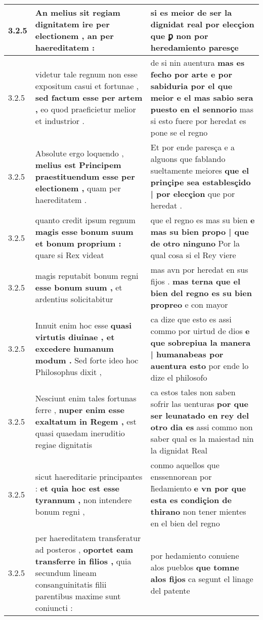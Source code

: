 \begin{tabular}{|p{1cm}|p{6.5cm}|p{6.5cm}|}
3.2.5 & An melius sit regiam dignitatem \textbf{ ire per electionem , } an per haereditatem : & si es meior de ser la dignidat real \textbf{ por elecçion } que ꝑ non por heredamiento paresçe \\\hline
3.2.5 & videtur tale regnum non esse expositum casui et fortunae , \textbf{ sed factum esse per artem , } eo quod praeficietur melior et industrior . & de si nin auentura \textbf{ mas es fecho por arte e por sabiduria por el que meior e el mas sabio sera puesto en el sennorio } mas si esto fuere por heredat es pone se el regno \\\hline
3.2.5 & Absolute ergo loquendo , \textbf{ melius est Principem praestituendum esse per electionem , } quam per haereditatem . & Et por ende paresça e a alguons que fablando sueltamente meiores \textbf{ que el prinçipe sea establesçido | por elecçion } que por heredat . \\\hline
3.2.5 & quanto credit ipsum regnum \textbf{ magis esse bonum suum et bonum proprium : } quare si Rex videat & que el regno es mas su bien \textbf{ e mas su bien propo | que de otro ninguno } Por la qual cosa si el Rey viere \\\hline
3.2.5 & magis reputabit bonum regni \textbf{ esse bonum suum , } et ardentius solicitabitur & mas avn por heredat en sus fijos . \textbf{ mas terna que el bien del regno es su bien propreo } e con mayor \\\hline
3.2.5 & Innuit enim hoc esse \textbf{ quasi virtutis diuinae , et excedere humanum modum . } Sed forte ideo hoc Philosophus dixit , & ca dize que esto es assi commo por uirtud de dios \textbf{ e que sobrepiua la manera | humanabeas por auentura esto } por ende lo dize el philosofo \\\hline
3.2.5 & Nesciunt enim tales fortunas ferre , \textbf{ nuper enim esse exaltatum in Regem , } est quasi quaedam ineruditio regiae dignitatis & ca estos tales non saben sofrir las uenturas \textbf{ por que ser leunatado en rey del otro dia es } assi commo non saber qual es la maiestad nin la dignidat Real \\\hline
3.2.5 & sicut haereditarie principantes : \textbf{ et quia hoc est esse tyrannum , } non intendere bonum regni , & conmo aquellos que enssennorean por h̃edamiento \textbf{ e vn por que esta es condiçion de thirano } non tener mientes en el bien del regno \\\hline
3.2.5 & per haereditatem transferatur ad posteros , \textbf{ oportet eam transferre in filios , } quia secundum lineam consanguinitatis filii parentibus maxime sunt coniuncti : & por hedamiento conuiene alos pueblos \textbf{ que tomne alos fijos } ca segunt el linage del patente \\\hline

\end{tabular}
